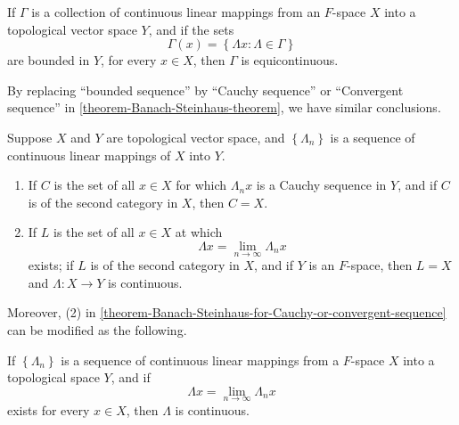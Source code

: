\begin{corollary}
  \label{corollary-Banach-Steinhaus-theorem}
  If \( \Gamma \) is a collection of continuous linear mappings from an \( F \)-space \( X \) into a topological vector space \( Y \), and if the sets
  \[
    \Gamma(x) = \left\lbrace \Lambda x: \Lambda \in \Gamma \right\rbrace
  \]
  are bounded in \( Y \), for every \( x \in X \), then \( \Gamma \) is equicontinuous.
\end{corollary}


By replacing ``bounded sequence'' by ``Cauchy sequence'' or ``Convergent sequence'' in \ref{theorem-Banach-Steinhaus-theorem}, we have similar conclusions.

\begin{theorem}
  \label{theorem-Banach-Steinhaus-for-Cauchy-or-convergent-sequence}
  Suppose \( X \) and \( Y \) are topological vector space, and \( \left\lbrace \Lambda_n \right\rbrace \) is a sequence of continuous linear mappings of \( X \) into \( Y \).
  \begin{enumerate}
    \item If \( C \) is the set of all \( x \in X \) for which \( \Lambda_n x \) is a Cauchy sequence in \( Y \), and if \( C \) is of the second category in \( X \), then \( C = X \).
    \item If \( L \) is the set of all \( x \in X \) at which
          \[
            \Lambda x = \lim\limits_{n \to \infty} \Lambda_n x
          \]
          exists; if \( L \) is of the second category in \( X \), and if \( Y \) is an \( F \)-space, then \( L = X \) and \( \Lambda: X \to Y \) is continuous.
  \end{enumerate}
\end{theorem}

Moreover, (2) in \ref{theorem-Banach-Steinhaus-for-Cauchy-or-convergent-sequence} can be modified as the following.

\begin{theorem}
  \label{theorem-Banach-Steinhaus-for-convergent-sequence-in-F-space}
  If \( \left\lbrace \Lambda_n \right\rbrace \) is a sequence of continuous linear mappings from a \( F \)-space \( X \) into a topological space \( Y \), and if
  \[
    \Lambda x = \lim\limits_{n \to \infty} \Lambda_n x
  \]
  exists for every \( x \in X \), then \( \Lambda \) is continuous.
\end{theorem}

